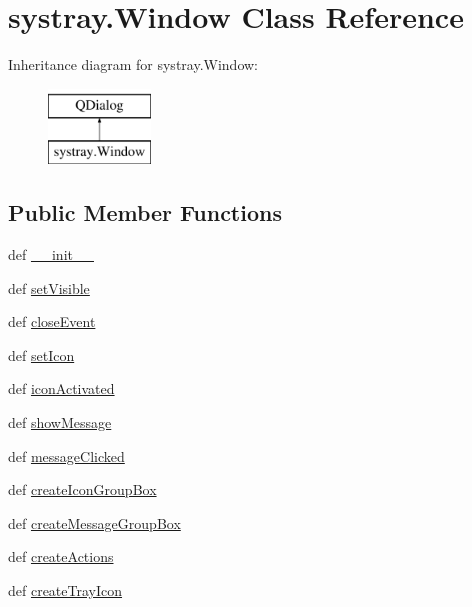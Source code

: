 \hypertarget{classsystray_1_1Window}{}\section{systray.\+Window Class Reference}
\label{classsystray_1_1Window}
Inheritance diagram for systray.\+Window\+:\begin{figure}[H]
\begin{center}
\leavevmode
\includegraphics[height=2.000000cm]{classsystray_1_1Window}
\end{center}
\end{figure}
\subsection*{Public Member Functions}
\begin{DoxyCompactItemize}
\item 
def \hyperlink{classsystray_1_1Window_af6d9210fe937ec1001ded0da5acc3754}{\+\_\+\+\_\+init\+\_\+\+\_\+}
\item 
def \hyperlink{classsystray_1_1Window_a23522cafeed8063698f5f539ced873d7}{set\+Visible}
\item 
def \hyperlink{classsystray_1_1Window_a812c4de517d0efa9bcf3fb9c0226e70c}{close\+Event}
\item 
def \hyperlink{classsystray_1_1Window_a30954acd478960045d606e12d2ce3a11}{set\+Icon}
\item 
def \hyperlink{classsystray_1_1Window_a05ccf78225bd33b6f51e40d61268b5ef}{icon\+Activated}
\item 
def \hyperlink{classsystray_1_1Window_a30be76e05c89c601ee797a180610d9fc}{show\+Message}
\item 
def \hyperlink{classsystray_1_1Window_ae55d6addfe7ee7dba6954ac9fdfb1259}{message\+Clicked}
\item 
def \hyperlink{classsystray_1_1Window_a90f1d25b68a3f3522f74d0035d777fc8}{create\+Icon\+Group\+Box}
\item 
def \hyperlink{classsystray_1_1Window_a80af1a6f09c8db3fef6aeab0ac55f11f}{create\+Message\+Group\+Box}
\item 
def \hyperlink{classsystray_1_1Window_a6d9dfa0a1e6ad266a1d732a136a2b487}{create\+Actions}
\item 
def \hyperlink{classsystray_1_1Window_aeafd0eb065ecc1972c8fde2762695be8}{create\+Tray\+Icon}
\end{DoxyCompactItemize}
